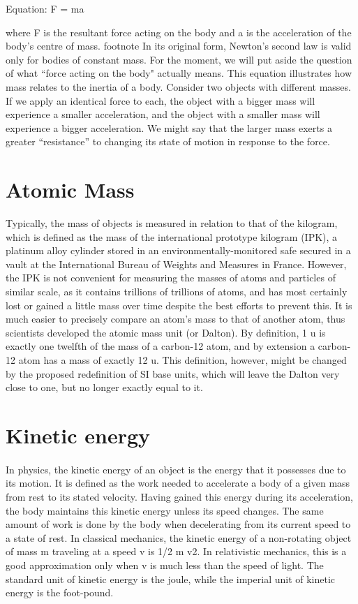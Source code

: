 \documentclass{book}
\begin{document}
	Equation: F = ma
	
	where F is the resultant force acting on the body and a is the acceleration of the body's centre of mass. footnote{ In its original form, Newton's second law is valid only for bodies of constant mass.} For the moment, we will put aside the question of what ``force acting on the body" actually means. This equation illustrates how mass relates to the inertia of a body. Consider two objects with different masses. If we apply an identical force to each, the object with a bigger mass will experience a smaller acceleration, and the object with a smaller mass will experience a bigger acceleration. We might say that the larger mass exerts a greater ``resistance'' to changing its state of motion in response to the force.
	
	\section{Atomic Mass}
	Typically, the mass of objects is measured in relation to that of the kilogram, which is defined as the mass of the international prototype kilogram (IPK), a platinum alloy cylinder stored in an environmentally-monitored safe secured in a vault at the International Bureau of Weights and Measures in France. However, the IPK is not convenient for measuring the masses of atoms and particles of similar scale, as it contains trillions of trillions of atoms, and has most certainly lost or gained a little mass over time despite the best efforts to prevent this. It is much easier to precisely compare an atom's mass to that of another atom, thus scientists developed the atomic mass unit (or Dalton). By definition, 1 u is exactly one twelfth of the mass of a carbon-12 atom, and by extension a carbon-12 atom has a mass of exactly 12 u. This definition, however, might be changed by the proposed redefinition of SI base units, which will leave the Dalton very close to one, but no longer exactly equal to it.
	
	
	\section{Kinetic energy}
	\paragraph{}
	In physics, the kinetic energy of an object is the energy that it possesses due to its motion. It is defined as the work needed to accelerate a body of a given mass from rest to its stated velocity. Having gained this energy during its acceleration, the body maintains this kinetic energy unless its speed changes. The same amount of work is done by the body when decelerating from its current speed to a state of rest. In classical mechanics, the kinetic energy of a non-rotating object of mass m traveling at a speed v is 1/2 m v2. In relativistic mechanics, this is a good approximation only when v is much less than the speed of light. The standard unit of kinetic energy is the joule, while the imperial unit of kinetic energy is the foot-pound.
	
\end{document}
